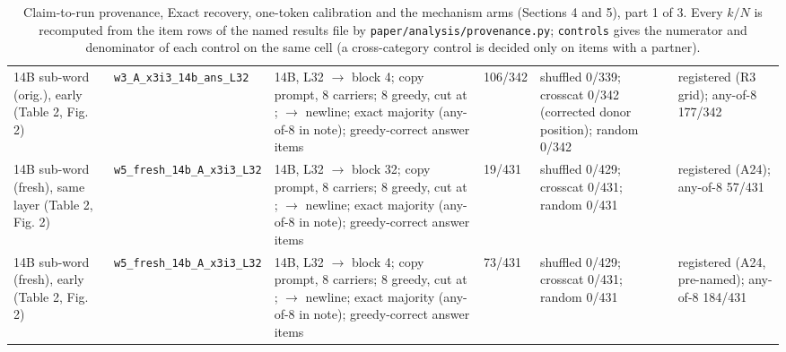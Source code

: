 \begin{table}[t]
\begin{tabular}{@{}p{2.5cm}p{2.3cm}p{4.5cm}p{1.3cm}p{3.0cm}p{2.9cm}@{}}
14B sub-word (orig.), early (Table 2, Fig. 2) & \texttt{w3\_\allowbreak{{}}A\_\allowbreak{{}}x3i3\_\allowbreak{{}}14b\_\allowbreak{{}}ans\_\allowbreak{{}}L32} & 14B, L32 $\to$ block 4; copy prompt, 8 carriers; 8 greedy, cut at ; $\to$ newline; exact majority (any-of-8 in note); greedy-correct answer items & 106/342 & shuffled 0/339; crosscat 0/342 (corrected donor position); random 0/342 & registered (R3 grid); any-of-8 177/342 \\
14B sub-word (fresh), same layer (Table 2, Fig. 2) & \texttt{w5\_\allowbreak{{}}fresh\_\allowbreak{{}}14b\_\allowbreak{{}}A\_\allowbreak{{}}x3i3\_\allowbreak{{}}L32} & 14B, L32 $\to$ block 32; copy prompt, 8 carriers; 8 greedy, cut at ; $\to$ newline; exact majority (any-of-8 in note); greedy-correct answer items & 19/431 & shuffled 0/429; crosscat 0/431; random 0/431 & registered (A24); any-of-8 57/431 \\
14B sub-word (fresh), early (Table 2, Fig. 2) & \texttt{w5\_\allowbreak{{}}fresh\_\allowbreak{{}}14b\_\allowbreak{{}}A\_\allowbreak{{}}x3i3\_\allowbreak{{}}L32} & 14B, L32 $\to$ block 4; copy prompt, 8 carriers; 8 greedy, cut at ; $\to$ newline; exact majority (any-of-8 in note); greedy-correct answer items & 73/431 & shuffled 0/429; crosscat 0/431; random 0/431 & registered (A24, pre-named); any-of-8 184/431 \\
\bottomrule
\end{tabular}
\caption{Claim-to-run provenance, Exact recovery, one-token calibration and the mechanism arms (Sections 4 and 5), part 1 of 3. Every $k/N$ is recomputed from the item rows of the named results file by \texttt{paper/analysis/provenance.py}; \texttt{controls} gives the numerator and denominator of each control on the same cell (a cross-category control is decided only on items with a partner).}
\end{table}

